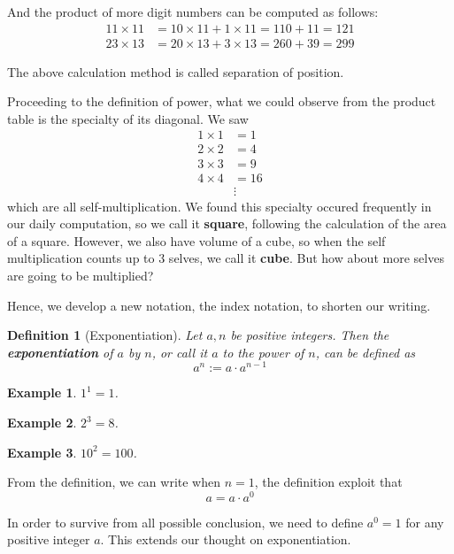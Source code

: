 \documentclass[12pt]{article}
\newtheorem{definition}{Definition}[section]
\newtheorem*{example}{Example}
\begin{document}
    And the product of more digit numbers can be computed as follows:\begin{align*}
        11\times 11&=10\times 11 + 1\times 11=110+11=121\\
        23\times 13&=20\times 13 + 3\times 13=260+39=299
    \end{align*}

    The above calculation method is called separation of position.

    Proceeding to the definition of power, what we could observe from the product table is the specialty of its diagonal. We saw\begin{align*}
        1\times 1&=1\\
        2\times 2&=4\\
        3\times 3&=9\\
        4\times 4&=16\\
        &\vdots
    \end{align*} 
    which are all self-multiplication. We found this specialty occured frequently in our daily computation, so we call it \textbf{square}, following the calculation of the area of a square. However, we also have volume of a cube, so when the self multiplication counts up to 3 selves, we call it \textbf{cube}. But how about more selves are going to be multiplied?

    Hence, we develop a new notation, the index notation, to shorten our writing.

    \begin{definition}[Exponentiation]
        Let $a,n$ be positive integers. Then the \textbf{exponentiation} of $a$ by $n$, or call it $a$ to the power of $n$, can be defined as $$a^n:=a\cdot a^{n-1}$$
    \end{definition}

    \begin{example}
        $1^1=1$.
    \end{example}

    \begin{example}
        $2^3=8$.
    \end{example}

    \begin{example}
        $10^2=100$.
    \end{example}

    From the definition, we can write when $n=1$, the definition exploit that $$a=a\cdot a^0$$

    In order to survive from all possible conclusion, we need to define $a^0=1$ for any positive integer $a$. This extends our thought on exponentiation.
\end{document}
